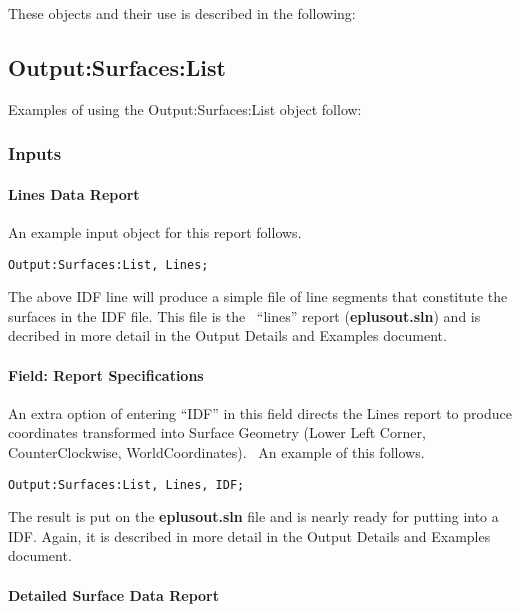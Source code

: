 These objects and their use is described in the following:

\subsection{Output:Surfaces:List}\label{outputsurfaceslist}

Examples of using the Output:Surfaces:List object follow:

\subsubsection{Inputs}\label{inputs-040}

\paragraph{Lines Data Report}\label{lines-data-report}

An example input object for this report follows.

\begin{lstlisting}
Output:Surfaces:List, Lines;
\end{lstlisting}

The above IDF line will produce a simple file of line segments that constitute the surfaces in the IDF file. This file is the~ ``lines'' report (\textbf{eplusout.sln}) and is decribed in more detail in the Output Details and Examples document.

\paragraph{Field: Report Specifications}\label{field-report-specifications}

An extra option of entering ``IDF'' in this field directs the Lines report to produce coordinates transformed into Surface Geometry (Lower Left Corner, CounterClockwise, WorldCoordinates).~ An example of this follows.

\begin{lstlisting}
Output:Surfaces:List, Lines, IDF;
\end{lstlisting}

The result is put on the \textbf{eplusout.sln} file and is nearly ready for putting into a IDF. Again, it is described in more detail in the Output Details and Examples document.

\paragraph{Detailed Surface Data Report}\label{detailed-surface-data-report}

